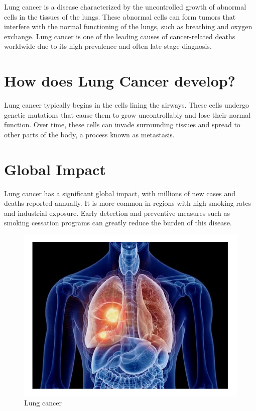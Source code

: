 Lung cancer is a disease characterized by the uncontrolled growth of abnormal cells in the tissues of the lungs. These abnormal cells can form tumors that interfere with the normal functioning of the lungs, such as breathing and oxygen exchange. Lung cancer is one of the leading causes of cancer-related deaths worldwide due to its high prevalence and often late-stage diagnosis.

\section{How does Lung Cancer develop?}
\begin{remark}
Lung cancer typically begins in the cells lining the airways. These cells undergo genetic mutations that cause them to grow uncontrollably and lose their normal function. Over time, these cells can invade surrounding tissues and spread to other parts of the body, a process known as metastasis.
\end{remark}

\section{Global Impact}
\begin{outline}
Lung cancer has a significant global impact, with millions of new cases and deaths reported annually. It is more common in regions with high smoking rates and industrial exposure. Early detection and preventive measures such as smoking cessation programs can greatly reduce the burden of this disease.
\end{outline}

\begin{figure}[h!]
    \centering
    \includegraphics[width= 0.85\linewidth]{images/lung_c.jpeg}
    \caption{Lung cancer}
    \label{fig:enter-label}
\end{figure}